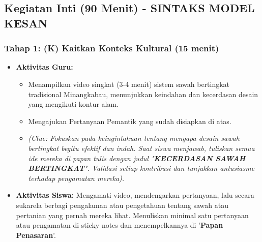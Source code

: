\documentclass[a4paper,12pt]{article}
\begin{document}
\subsection{Kegiatan Inti (90 Menit) - SINTAKS MODEL KESAN}

\subsubsection{Tahap 1: (K) Kaitkan Konteks Kultural (15 menit)}
\begin{itemize}
\item \textbf{Aktivitas Guru:}
    \begin{itemize}
    \item Menampilkan video singkat (3-4 menit) sistem sawah bertingkat tradisional Minangkabau, menunjukkan keindahan dan kecerdasan desain yang mengikuti kontur alam.
    \item Mengajukan Pertanyaan Pemantik yang sudah disiapkan di atas.
    \item \textit{(Clue: Fokuskan pada keingintahuan tentang mengapa desain sawah bertingkat begitu efektif dan indah. Saat siswa menjawab, tuliskan semua ide mereka di papan tulis dengan judul "\textbf{KECERDASAN SAWAH BERTINGKAT}". Validasi setiap kontribusi dan tunjukkan antusiasme terhadap pengamatan mereka).}
    \end{itemize}
\item \textbf{Aktivitas Siswa:} Mengamati video, mendengarkan pertanyaan, lalu secara sukarela berbagi pengalaman atau pengetahuan tentang sawah atau pertanian yang pernah mereka lihat. Menuliskan minimal satu pertanyaan atau pengamatan di sticky notes dan menempelkannya di '\textbf{Papan Penasaran}'.
\end{itemize}
\end{document}
